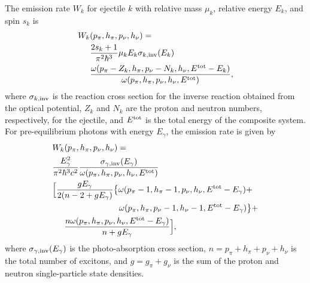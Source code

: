 \documentclass[
10pt,
showpacs,preprintnumbers,footinbib,
amsfonts,amsmath,amssymb,
aps,
prc,twocolumn,groupedaddress,superscriptaddress,
showkeys,
nofootinbib
]{revtex4-1}
\begin{document}
The emission rate $W_k$ for ejectile $k$ with relative mass $\mu_k$, relative energy $E_k$, and spin $s_k$ is~\cite{Cline:1983,Dobes:1983}
\begin{align}
W_k&(p_\pi,h_\pi,p_\nu,h_\nu) = \notag \\
  & \frac{2s_k+1}{\pi^2\hbar^3} \mu_k E_k \sigma_{k,{\rm inv}}(E_k) \notag\\ 
  &\frac{\omega(p_\pi -Z_k,h_\pi,p_\nu-N_k,h_\nu,E^{\rm tot} - E_k)}
           {\omega(p_\pi,h_\pi,p_\nu,h_\nu,E^{\rm tot})},
     \label{eq:part-em-rate}
\end{align}
where $\sigma_{k,{\rm inv}}$ is the reaction cross section for the inverse reaction obtained from the optical potential, $Z_k$ and $N_k$ are the proton and neutron numbers, respectively, for
the ejectile, and $E^{\rm tot}$ is the total energy of the composite system. For pre-equilibrium photons with energy $E_\gamma$, the emission rate is given by~\cite{Akkermans:1985}
\begin{align}
& W_k(p_\pi,h_\pi,p_\nu,h_\nu) = \notag \\
  & \frac{E_\gamma^2}{\pi^2\hbar^3c^2} \frac{\sigma_{\gamma,{\rm inv}}(E_\gamma)}{\omega(p_\pi,h_\pi,p_\nu,h_\nu,E^{\rm tot})} \notag \\ 
  & \Big [\frac{gE_\gamma}{2(n-2 +gE_\gamma)} \big \{\omega(p_\pi-1,h_\pi-1,p_\nu,h_\nu,E^{\rm tot}-E_\gamma)  +  \notag \\
  &\hskip 2.8 cm \omega(p_\pi,h_\pi,p_\nu-1,h_\nu-1,E^{\rm tot} - E_\gamma) \big \} + \notag \\
  & \hskip 0.5 cm \frac{n\omega(p_\pi,h_\pi,p_\nu,h_\nu,E^{\rm tot}-E_\gamma)}{n+gE_\gamma} \Big ],
     \label{eq:gam-em-rate}
\end{align}
where $\sigma_{\gamma,{\rm inv}}(E_\gamma)$ is the photo-absorption cross section, $n = p_\pi+h_\pi+p_\nu+h_\nu$ is the total number of excitons, and $g = g_\pi + g_\nu$ is the sum of the proton and neutron single-particle state densities.
\end{document}
